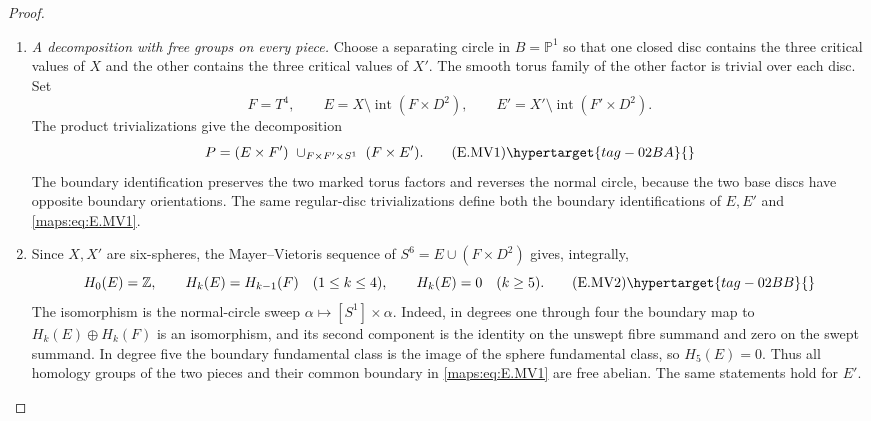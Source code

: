 \begin{proof}
\begin{enumerate}[label={$\langle1\rangle$\arabic*.},leftmargin=*]
\item \emph{A decomposition with free groups on every piece.}
Choose a separating circle in $B=\mathbb P^1$ so that one closed
disc contains the three critical values of $X$ and the other
contains the three critical values of $X'$. The smooth torus
family of the other factor is trivial over each disc. Set
\[
 F=T^4,\qquad E=X\setminus\operatorname{int}(F\times D^2),
 \qquad E'=X'\setminus\operatorname{int}(F'\times D^2).
\]
The product trivializations give the decomposition
\[
 P=(E\times F')\ \cup_{F\times F'\times S^1}\ (F\times E').
 \tag{E.MV1}\hypertarget{tag-02BA}{}\label{maps:eq:E.MV1}
\]
The boundary identification preserves the two marked torus factors
and reverses the normal circle, because the two base discs have
opposite boundary orientations. The same regular-disc trivializations define both the
boundary identifications of $E,E'$ and \eqref{maps:eq:E.MV1}.

\item Since $X,X'$ are six-spheres, the Mayer--Vietoris sequence of
$S^6=E\cup(F\times D^2)$ gives, integrally,
\[
 H_0(E)=\mathbb Z,\qquad H_k(E)=H_{k-1}(F)\quad(1\leq k\leq4),
 \qquad H_k(E)=0\quad(k\geq5).
 \tag{E.MV2}\hypertarget{tag-02BB}{}\label{maps:eq:E.MV2}
\]
The isomorphism is the normal-circle sweep
$\alpha\mapsto[S^1]\times\alpha$. Indeed, in degrees one
through four the boundary map to $H_k(E)\oplus H_k(F)$ is
an isomorphism, and its second component is the identity on
the unswept fibre summand and zero on the swept summand.
In degree five the boundary fundamental class is the image
of the sphere fundamental class, so $H_5(E)=0$.
Thus all homology groups of the two pieces and their common
boundary in \eqref{maps:eq:E.MV1} are free abelian. The same statements hold
for $E'$.


\end{enumerate}
\end{proof}
